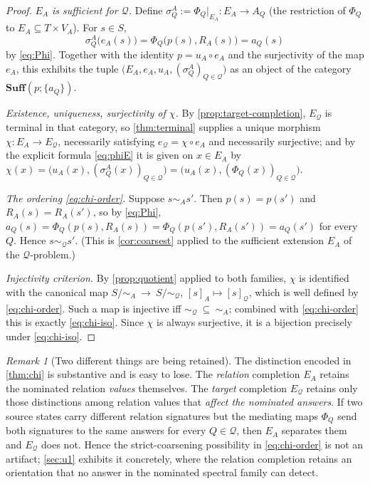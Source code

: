 \documentclass[11pt,reqno]{amsart}
\theoremstyle{plain}
\theoremstyle{definition}
\theoremstyle{remark}
\newtheorem{remark}[theorem]{Remark}
\numberwithin{equation}{section}
\begin{document}
\begin{proof}
\emph{$E_A$ is sufficient for $\mathcal Q$.} Define $\sigma_Q^{A}:=\Phi_Q|_{E_A}\colon E_A\to A_Q$
(the restriction of $\Phi_Q$ to $E_A\subseteq T\times V_A$). For $s\in S$,
\[
\sigma_Q^{A}\bigl(e_A(s)\bigr)=\Phi_Q\bigl(p(s),R_A(s)\bigr)=a_Q(s)
\]
by \eqref{eq:Phi}. Together with the identity $p=u_A\circ e_A$ and the surjectivity of
the map $e_A$, this exhibits the tuple
$\bigl(E_A,e_A,u_A,(\sigma_Q^A)_{Q\in\mathcal Q}\bigr)$ as an object of the category
$\mathbf{Suff}(p;\{a_Q\})$.

\emph{Existence, uniqueness, surjectivity of $\chi$.} By \cref{prop:target-completion},
$E_{\mathcal Q}$ is terminal in that category, so \cref{thm:terminal} supplies a unique morphism
$\chi\colon E_A\to E_{\mathcal Q}$, necessarily satisfying $e_{\mathcal Q}=\chi\circ e_A$ and
necessarily surjective; and by the explicit formula \eqref{eq:phiE} it is given on $x\in E_A$ by
$\chi(x)=\bigl(u_A(x),(\sigma_Q^A(x))_{Q\in\mathcal Q}\bigr)
=\bigl(u_A(x),(\Phi_Q(x))_{Q\in\mathcal Q}\bigr)$.

\emph{The ordering \eqref{eq:chi-order}.} Suppose $s\sim_A s'$. Then $p(s)=p(s')$ and $R_A(s)=R_A(s')$,
so by \eqref{eq:Phi}, $a_Q(s)=\Phi_Q(p(s),R_A(s))=\Phi_Q(p(s'),R_A(s'))=a_Q(s')$ for every $Q$. Hence
$s\sim_{\mathcal Q}s'$. (This is \cref{cor:coarsest} applied to the sufficient extension $E_A$ of the
$\mathcal Q$-problem.)

\emph{Injectivity criterion.} By \cref{prop:quotient} applied to both families, $\chi$ is identified
with the canonical map $S/\!\sim_A\ \to\ S/\!\sim_{\mathcal Q}$, $[s]_A\mapsto[s]_{\mathcal Q}$, which
is well defined by \eqref{eq:chi-order}. Such a map is injective iff
$\sim_{\mathcal Q}\ \subseteq\ \sim_A$; combined with \eqref{eq:chi-order} this is exactly
\eqref{eq:chi-iso}. Since $\chi$ is always surjective, it is a bijection precisely under
\eqref{eq:chi-iso}.
\end{proof}

\begin{remark}[Two different things are being retained]
\label{rem:rel-vs-target}
The distinction encoded in \cref{thm:chi} is substantive and is easy to lose. The \emph{relation}
completion $E_A$ retains the nominated relation \emph{values} themselves. The \emph{target}
completion $E_{\mathcal Q}$ retains only those distinctions among relation values that \emph{affect
the nominated answers}. If two source states carry different relation signatures but the mediating
maps $\Phi_Q$ send both signatures to the same answers for every $Q\in\mathcal Q$, then $E_A$
separates them and $E_{\mathcal Q}$ does not. Hence the strict-coarsening possibility in
\eqref{eq:chi-order} is not an artifact; \cref{sec:u1} exhibits it concretely, where the relation
completion retains an orientation that no answer in the nominated spectral family can detect.
\end{remark}
\end{document}
